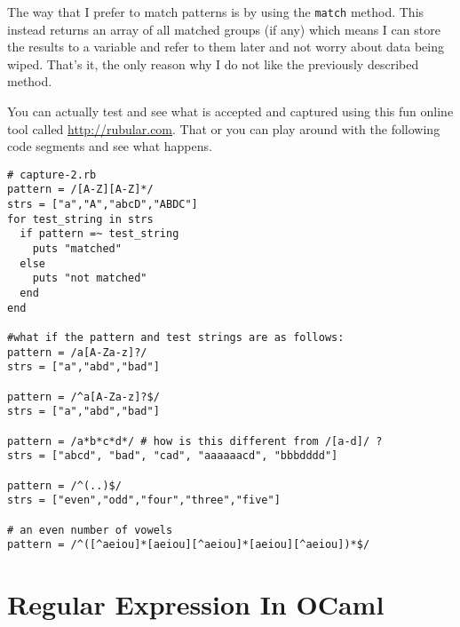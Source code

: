 \documentclass[main.tex]{subfiles}
\begin{document}
The way that I prefer to match patterns is by using the \texttt{match} method. This instead returns an array of all matched groups (if any) which means I can store the results to a variable and refer to them later and not worry about data being wiped. That's it, the only reason why I do not like the previously described method.

You can actually test and see what is accepted and captured using this fun online tool called \url{http://rubular.com}. That or you can play around with the following code segments and see what happens. 

\begin{lstlisting}[style=MyRubyStyle]
# capture-2.rb
pattern = /[A-Z][A-Z]*/
strs = ["a","A","abcD","ABDC"] 
for test_string in strs
  if pattern =~ test_string
    puts "matched"
  else
    puts "not matched"
  end
end

#what if the pattern and test strings are as follows:
pattern = /a[A-Za-z]?/
strs = ["a","abd","bad"]

pattern = /^a[A-Za-z]?$/
strs = ["a","abd","bad"]

pattern = /a*b*c*d*/ # how is this different from /[a-d]/ ?
strs = ["abcd", "bad", "cad", "aaaaaacd", "bbbdddd"]

pattern = /^(..)$/
strs = ["even","odd","four","three","five"]

# an even number of vowels
pattern = /^([^aeiou]*[aeiou][^aeiou]*[aeiou][^aeiou])*$/
\end{lstlisting}

\section{Regular Expression In OCaml}
\end{document}
